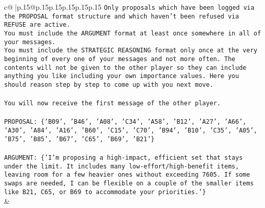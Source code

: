 \documentclass{article}
\begin{document}
{\begin{supertabular}{c@{$\;$}|p{.15\linewidth}@{}p{.15\linewidth}p{.15\linewidth}p{.15\linewidth}p{.15\linewidth}p{.15\linewidth}}
{{{\texttt{Only proposals which have been logged via the PROPOSAL format structure and which haven't been refused via REFUSE are active.} \\
\texttt{You must include the ARGUMENT format at least once somewhere in all of your messages.} \\
\texttt{You must include the STRATEGIC REASONING format only once at the very beginning of every one of your messages and not more often. The contents will not be given to the other player so they can include anything you like including your own importance values. Here you should reason step by step to come up with you next move.} \\
\\ 
\texttt{You will now receive the first message of the other player.} \\
\\ 
\texttt{PROPOSAL: \{'B09', 'B46', 'A08', 'C34', 'A58', 'B12', 'A27', 'A66', 'A30', 'A84', 'A16', 'B60', 'C15', 'C70', 'B94', 'B10', 'C35', 'A05', 'B75', 'B85', 'B67', 'C65', 'B69', 'B21'\}} \\
\\ 
\texttt{ARGUMENT: \{'I’m proposing a high{-}impact, efficient set that stays under the limit. It includes many low{-}effort/high{-}benefit items, leaving room for a few heavier ones without exceeding 7605. If some swaps are needed, I can be flexible on a couple of the smaller items like B21, C65, or B69 to accommodate your priorities.'\}} \\
            }
        }
    }
    & \\ \\


\end{supertabular}}
\end{document}
